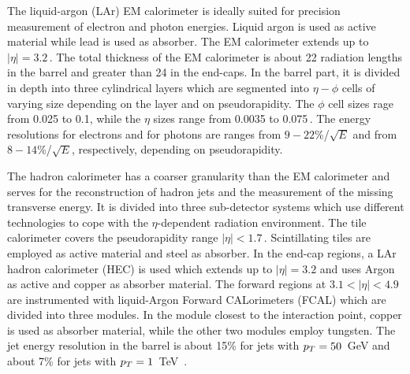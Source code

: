 The liquid-argon (LAr) EM calorimeter is ideally suited for precision measurement of electron and photon
energies. Liquid argon is used as  active material while lead is used as absorber. The EM calorimeter extends up to $|\eta| = 3.2\,.$
The total thickness of the EM calorimeter is about 22 radiation lengths in the barrel and greater than 24 in the
end-caps. In the barrel part, it is divided in depth into three cylindrical layers 
which are  segmented into $\eta-\phi$ cells of varying  size depending on the layer and 
on pseudorapidity. The $\phi$ cell sizes  rage from  0.025 to 0.1, while the $\eta$ sizes range 
from 0.0035 to 0.075\,.
The energy resolutions for electrons and for 
photons are ranges from $9-22$\%/$\sqrt{E}$ and from $8-14$\%/$\sqrt{E}$, respectively, depending on
pseudorapidity.

The hadron calorimeter has a coarser granularity than the EM calorimeter and  serves  for the 
reconstruction of hadron jets and the measurement of the missing transverse energy. It 
is divided into three sub-detector systems which  use different technologies to cope 
with the $\eta$-dependent radiation environment. The tile calorimeter covers the pseudorapidity range  $|\eta| < 1.7\,$. 
Scintillating tiles are employed as active material and steel as absorber. 
In the end-cap regions,  a LAr hadron  calorimeter (HEC) is used 
which extends up to $|\eta| = 3.2$ and uses Argon as  active and copper as absorber material. 
The  forward regions at  $3.1 <|\eta| < 4.9$ are instrumented  with 
liquid-Argon Forward CALorimeters (FCAL)  
which are divided into three modules. In the module closest to the interaction point, copper is used as absorber material, 
while the other two modules employ tungsten.
The jet energy resolution in the barrel is  about 15\% for jets with $p_{T}=50$~GeV and 
 about 7\% for jets with $p_{T}=1$~TeV~\cite{jer}.


